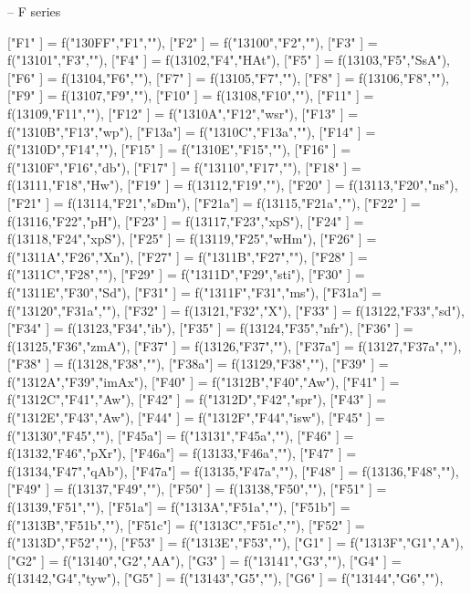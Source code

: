 {-- F series

["F1"  ]  = f("130FF","F1",""),
["F2"  ]  = f("13100","F2",""),
["F3"  ]  = f("13101","F3",""),
["F4"  ]  = f(13102,"F4","HAt"),
["F5"  ]  = f(13103,"F5","SsA"),
["F6"  ]  = f(13104,"F6",""),
["F7"  ]  = f(13105,"F7",""),
["F8"  ]  = f(13106,"F8",""),
["F9"  ]  = f(13107,"F9",""),
["F10" ]  = f(13108,"F10",""),
["F11" ]  =  f(13109,"F11",""),
["F12" ]  =  f("1310A","F12","wsr"),
["F13" ]  =  f("1310B","F13","wp"),
["F13a"]  =  f("1310C","F13a",""),
["F14" ]  =  f("1310D","F14",""),
["F15" ]  =  f("1310E","F15",""),
["F16" ]  =  f("1310F","F16","db"),
["F17" ]  =  f("13110","F17",""),
["F18" ]  = f(13111,"F18","Hw"),
["F19" ]  = f(13112,"F19",""),
["F20" ]  = f(13113,"F20","ns"),
["F21" ]  = f(13114,"F21","sDm"),
["F21a"]  = f(13115,"F21a",""),
["F22" ]  = f(13116,"F22","pH"),
["F23" ]       = f(13117,"F23","xpS"),
["F24" ]       = f(13118,"F24","xpS"),
["F25" ]       = f(13119,"F25","wHm"),
["F26" ]       = f("1311A","F26","Xn"),
["F27" ]       = f("1311B","F27",""),
["F28" ]       = f("1311C","F28",""),
["F29" ]       = f("1311D","F29","sti"),
["F30" ]       = f("1311E","F30","Sd"),
["F31" ]       = f("1311F","F31","ms"),
    ["F31a"]       = f("13120","F31a",""),
    ["F32" ]       = f(13121,"F32","X"),
["F33" ]       = f(13122,"F33","sd"),
["F34" ]       = f(13123,"F34","ib"),
["F35" ]       =  f(13124,"F35","nfr"),
["F36" ]       = f(13125,"F36","zmA"),
["F37" ]       = f(13126,"F37",""),
["F37a"]       = f(13127,"F37a",""),
["F38" ]       = f(13128,"F38",""),
["F38a"]       = f(13129,"F38",""),
["F39" ]       = f("1312A","F39","imAx"),
["F40" ]       = f("1312B","F40","Aw"),
["F41" ]       = f("1312C","F41","Aw"),
["F42" ]       = f("1312D","F42","spr"),
["F43" ]       = f("1312E","F43","Aw"),
["F44" ]       = f("1312F","F44","isw"),
["F45" ]       = f("13130","F45",""),
["F45a"]       = f("13131","F45a",""),
["F46" ]       = f(13132,"F46","pXr"),
["F46a"]       = f(13133,"F46a",""),
["F47" ]       = f(13134,"F47","qAb"),
["F47a"]       = f(13135,"F47a",""),
["F48" ]       = f(13136,"F48",""),
["F49" ]       = f(13137,"F49",""),
["F50" ]       = f(13138,"F50",""),
["F51" ]       = f(13139,"F51",""),
["F51a"]       = f("1313A","F51a",""),
["F51b"]       = f("1313B","F51b",""),
["F51c"]       = f("1313C","F51c",""),
["F52" ]       = f("1313D","F52",""),
["F53" ]       = f("1313E","F53",""),
["G1"  ]       = f("1313F","G1","A"),
["G2"  ]       = f("13140","G2","AA"),
["G3"  ]       = f("13141","G3",""),
["G4"  ]       = f(13142,"G4","tyw"),
["G5"  ]       = f("13143","G5",""),
["G6"  ]       = f("13144","G6",""),
}
